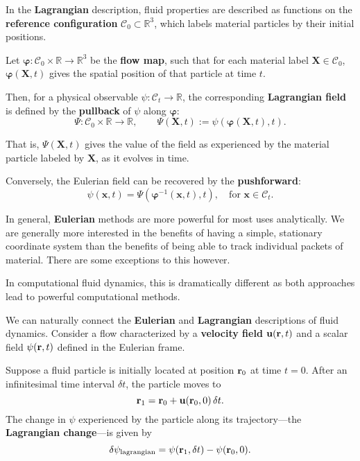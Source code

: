 \begin{definition}
\label{def:Lagrangian}
In the \textbf{Lagrangian} description, fluid properties are described as functions on the \textbf{reference configuration} \( \mathcal{C}_0 \subset \mathbb{R}^3 \), which labels material particles by their initial positions. 

Let \( \boldsymbol{\varphi}: \mathcal{C}_0 \times \mathbb{R} \to \mathbb{R}^3 \) be the \textbf{flow map}, such that for each material label \( \mathbf{X} \in \mathcal{C}_0 \), \( \boldsymbol{\varphi}(\mathbf{X}, t) \) gives the spatial position of that particle at time \( t \).

Then, for a physical observable \( \psi: \mathcal{C}_t \to \mathbb{R} \), the corresponding \textbf{Lagrangian field} is defined by the \textbf{pullback} of \( \psi \) along \( \boldsymbol{\varphi} \):
\[
\Psi: \mathcal{C}_0 \times \mathbb{R} \to \mathbb{R}, \qquad \Psi(\mathbf{X}, t) := \psi(\boldsymbol{\varphi}(\mathbf{X}, t), t).
\]

That is, \( \Psi(\mathbf{X}, t) \) gives the value of the field as experienced by the material particle labeled by \( \mathbf{X} \), as it evolves in time.

Conversely, the Eulerian field can be recovered by the \textbf{pushforward}:
\[
\psi(\mathbf{x}, t) = \Psi(\boldsymbol{\varphi}^{-1}(\mathbf{x}, t), t), \quad \text{for } \mathbf{x} \in \mathcal{C}_t.
\]
\end{definition}
\vspace{0.5cm}

\begin{remark}
    In general, \textbf{Eulerian} methods are more powerful for most uses analytically. We are generally more interested in the benefits of having a simple, stationary coordinate system than the benefits of being able to track individual packets of material. There are some exceptions to this however. 

    In computational fluid dynamics, this is dramatically different as both approaches lead to powerful computational methods.
\end{remark}
\vspace{0.5cm}

We can naturally connect the \textbf{Eulerian} and \textbf{Lagrangian} descriptions of fluid dynamics. Consider a flow characterized by a \textbf{velocity field} ${\bf u}({\bf r}, t)$ and a scalar field $\psi({\bf r}, t)$ defined in the Eulerian frame.

Suppose a fluid particle is initially located at position ${\bf r}_0$ at time $t = 0$. After an infinitesimal time interval $\delta t$, the particle moves to
\[
{\bf r}_1 = {\bf r}_0 + {\bf u}({\bf r}_0, 0) \, \delta t.
\]
The change in $\psi$ experienced by the particle along its trajectory—the \textbf{Lagrangian change}—is given by
\[
\delta \psi_{\rm lagrangian} = \psi({\bf r}_1, \delta t) - \psi({\bf r}_0, 0).
\]

